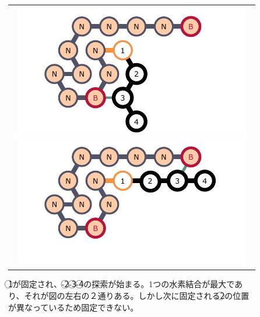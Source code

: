 \documentclass[a4,11pt]{article}
\begin{document}
\begin{center}
\begin{figure}[h]
\centering
\begin{tabular}{c}

\begin{minipage}{0.33\hsize}
\centering
	\includegraphics[width=\textwidth]{fig/svg/confex3_2.pdf}
\end{minipage}

\begin{minipage}{0.33\hsize}
\centering
	\includegraphics[width=\textwidth]{fig/svg/confex3_3.pdf}
\end{minipage}

\end{tabular}
\caption{\textcircled{\scriptsize 1}が固定され、{-}\textcircled{\scriptsize 2}{-}\textcircled{\scriptsize 3}{-}\textcircled{\scriptsize 4}の探索が始まる。1つの水素結合が最大であり、それが図の左右の２通りある。しかし次に固定される\textcircled{\scriptsize 2}の位置が異なっているため固定できない。}
\label{fig:glider3_02}
\end{figure}
\end{center}
%
%
\end{document}
